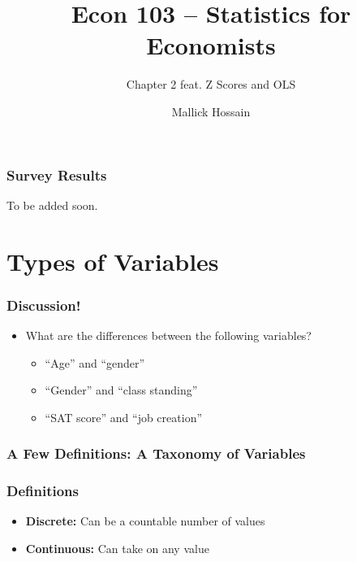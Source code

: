 \documentclass{beamer}
\title{Econ 103 -- Statistics for Economists}
\subtitle{Chapter 2 feat. Z Scores and OLS}
\author{Mallick Hossain}
\date{}
\institute{University of Pennsylvania}
\begin{document}
\begin{frame}
	\titlepage 
\end{frame} 

\begin{frame}
\frametitle{Survey Results}
	To be added soon.
\end{frame} 

\section{Types of Variables}
\begin{frame}
\frametitle{Discussion!}
	\begin{itemize}
		\item What are the differences between the following variables?
		\begin{itemize}
			\item ``Age'' and ``gender''
			\item ``Gender'' and ``class standing''
			\item ``SAT score'' and ``job creation''
		\end{itemize}
	\end{itemize}
\end{frame} 

\begin{frame}
\frametitle{A Few Definitions: A Taxonomy of Variables}
	\begin{figure}[htbp]
	\begin{center}
		\end{center}
	\end{figure}
\end{frame}

\begin{frame}
\frametitle{Definitions}
	\begin{itemize}
		\item \textbf{Discrete:} Can be a countable number of values
		\item \textbf{Continuous:} Can take on any value
	\end{itemize}
\end{frame}
\end{document}
